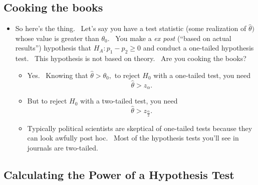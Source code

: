 \documentclass[11pt]{article}
\begin{document}
\subsection{Cooking the books}

\begin{itemize}
\item So here's the thing. \ Let's say you have a test statistic (some
realization of $\widehat{\theta })$ whose value is greater than $\theta
_{0}. $ \ You make a \textit{ex post }(\textquotedblleft based on actual
results\textquotedblright ) hypothesis that $H_{A}:p_{1}-p_{2}\geq 0$ and
conduct a one-tailed hypothesis test. \ This hypothesis is not based on
theory. \ Are you cooking the books?

\begin{itemize}
\item Yes. \ Knowing that $\widehat{\theta }>\theta _{0},$ to reject $H_{0}$
with a one-tailed test, you need%
\begin{equation*}
\widehat{\theta }>z_{\alpha }.
\end{equation*}

\item But to reject $H_{0}$ with a two-tailed test, you need%
\begin{equation*}
\widehat{\theta }>z_{\frac{\alpha }{2}}.
\end{equation*}

\item Typically political scientists are skeptical of one-tailed tests
because they can look awfully post hoc. \ Most of the hypothesis tests
you'll see in journals are two-tailed.
\end{itemize}
\end{itemize}

\subsection{Calculating the Power of a Hypothesis Test}
\end{document}
